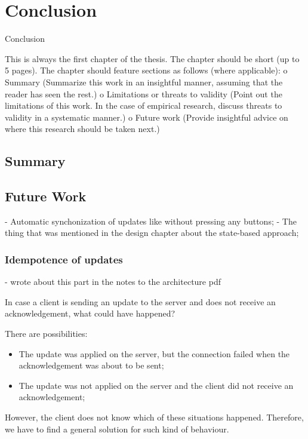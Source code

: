 \chapter{Conclusion}
\label{Conclusion}

Conclusion

This is always the first chapter of the thesis. The chapter should be short (up to 5 pages). The chapter should feature sections as follows (where applicable): o Summary (Summarize this work in an insightful manner, assuming that the reader has seen the rest.) o Limitations or threats to validity (Point out the limitations of this work. In the case of empirical research, discuss threats to validity in a systematic manner.) o Future work (Provide insightful advice on where this research should be taken next.)

\section{Summary}
\section{Future Work}

- Automatic synchonization of updates like without pressing any buttons;
- The thing that was mentioned in the design chapter about the state-based approach;

\subsection*{Idempotence of updates}

- wrote about this part in the notes to the architecture pdf



In case a client is sending an update to the server and does not receive an acknowledgement, what could have happened?

There are possibilities:
\begin{itemize}
    \item {The update was applied on the server, but the connection failed when the acknowledgement was about to be sent;}
    \item {The update was not applied on the server and the client did not receive an acknowledgement;}
\end{itemize}
However, the client does not know which of these situations happened. Therefore, we have to find a general solution for such kind of behaviour. 

